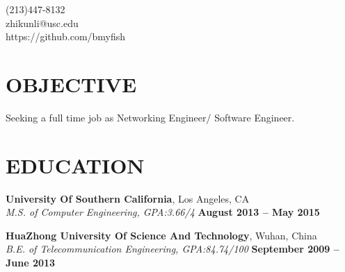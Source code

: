\documentclass[margin,line]{resume}
\begin{document}
{
	\sc
    \hfill (213)447-8132                  		  \vspace{0mm}\\\vspace{0mm}%
    \hfill zhikunli@usc.edu            		      \vspace{0mm}\\\vspace{0mm}%
    \hfill https://github.com/bmyfish             \vspace{0mm}\\\vspace{-10mm}%
}
\vspace{1mm}

\begin{resume}

\vspace{1mm}
	\section{\mysidestyle \textbf{\large{O}\small{BJECTIVE}}}
	Seeking a full time job as Networking Engineer/ Software Engineer.
	\sectionline

    \section{\mysidestyle \textbf{\large{E}\small{DUCATION}}}
    \textbf{\listing University Of Southern California}, Los Angeles, CA \vspace{2mm}\\\vspace{1mm}%
    \textsl{M.S. of Computer Engineering, GPA:3.66/4} \hfill \textbf{August 2013 -- May 2015}\vspace{-3mm}\\\vspace{-1mm}%

    \textbf{\listing HuaZhong University Of Science And Technology}, Wuhan, China \vspace{2mm}\\\vspace{1mm}%
    \textsl{B.E. of Telecommunication Engineering, GPA:84.74/100} \hfill \textbf{September 2009 -- June 2013}\vspace{-3mm}\\\vspace{-1mm}%



\end{resume}
\end{document}
